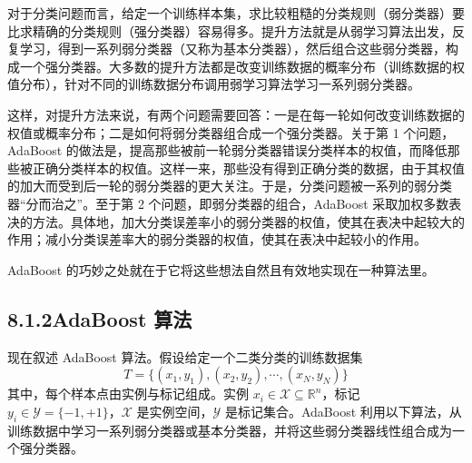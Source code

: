 \documentclass[UTF8,12pt,a4paper,fontset=fandol]{ctexart}
\begin{document}
对于分类问题而言，给定一个训练样本集，求比较粗糙的分类规则（弱分类器）要比求精确的分类规则（强分类器）容易得多。提升方法就是从弱学习算法出发，反复学习，得到一系列弱分类器（又称为基本分类器），然后组合这些弱分类器，构成一个强分类器。大多数的提升方法都是改变训练数据的概率分布（训练数据的权值分布），针对不同的训练数据分布调用弱学习算法学习一系列弱分类器。

这样，对提升方法来说，有两个问题需要回答：一是在每一轮如何改变训练数据的权值或概率分布；二是如何将弱分类器组合成一个强分类器。关于第 1 个问题，AdaBoost 的做法是，提高那些被前一轮弱分类器错误分类样本的权值，而降低那些被正确分类样本的权值。这样一来，那些没有得到正确分类的数据，由于其权值的加大而受到后一轮的弱分类器的更大关注。于是，分类问题被一系列的弱分类器“分而治之”。至于第 2 个问题，即弱分类器的组合，AdaBoost 采取加权多数表决的方法。具体地，加大分类误差率小的弱分类器的权值，使其在表决中起较大的作用；减小分类误差率大的弱分类器的权值，使其在表决中起较小的作用。

AdaBoost 的巧妙之处就在于它将这些想法自然且有效地实现在一种算法里。

\subsection*{8.1.2\quad AdaBoost 算法}

现在叙述 AdaBoost 算法。假设给定一个二类分类的训练数据集
\[
T=\{(x_1,y_1),(x_2,y_2),\cdots,(x_N,y_N)\}
\]
其中，每个样本点由实例与标记组成。实例 $x_i\in\mathcal{X}\subseteq\mathbb{R}^n$，标记 $y_i\in\mathcal{Y}=\{-1,+1\}$，$\mathcal{X}$ 是实例空间，$\mathcal{Y}$ 是标记集合。AdaBoost 利用以下算法，从训练数据中学习一系列弱分类器或基本分类器，并将这些弱分类器线性组合成为一个强分类器。
\end{document}
